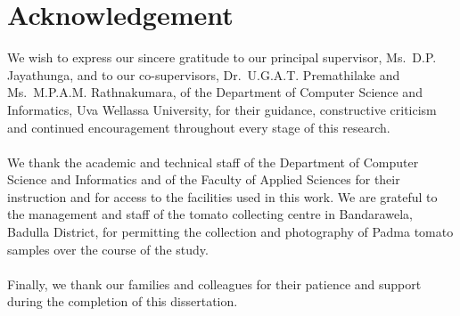 \section*{Acknowledgement}
We wish to express our sincere gratitude to our principal supervisor, Ms.\ D.P. Jayathunga, and to our co-supervisors, Dr.\ U.G.A.T. Premathilake and Ms.\ M.P.A.M. Rathnakumara, of the Department of Computer Science and Informatics, Uva Wellassa University, for their guidance, constructive criticism and continued encouragement throughout every stage of this research.\\ \\ We thank the academic and technical staff of the Department of Computer Science and Informatics and of the Faculty of Applied Sciences for their instruction and for access to the facilities used in this work. We are grateful to the management and staff of the tomato collecting centre in Bandarawela, Badulla District, for permitting the collection and photography of Padma tomato samples over the course of the study.\\ \\Finally, we thank our families and colleagues for their patience and support during the completion of this dissertation.
\clearpage
